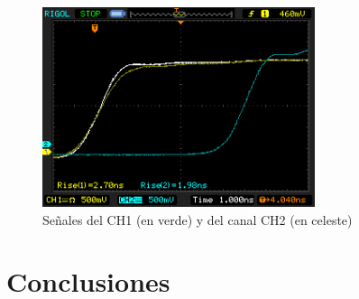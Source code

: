 \documentclass[a4paper,10pt]{article}
\begin{document}
		
		\begin{figure}[!htb]
			\centering
			\includegraphics[width=8cm]{Imagenes/Mediciones instrumentos/NewFile10.png}
			\caption{Se\~nales del CH1 (en verde) y del canal CH2 (en celeste)} \label{img008}
		\end{figure}
	\newpage
	\section{Conclusiones}
\end{document}
